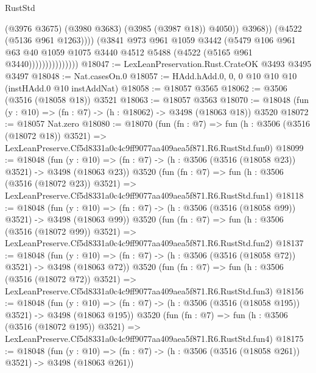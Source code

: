 \begin{lexlean}{RustStd}
\begin{coremodule}
                                      (@3976 @3675)
                                      (@3980 @3683)
                                      (@3985 (@3987 @18))
                                      @4050))
                                  @3968))
                              (@4522 (@5136 @961 @1263))))
                          (@3841
                            @973
                            @961
                            @1059
                            @3442
                            (@5479
                              @106
                              @961
                              @63
                              @40
                              @1059
                              @1075
                              @3440
                              @4512
                              @5488
                              (@4522 (@5165 @961 @3440)))))))))))))))
@18047 := LexLeanPreservation.Rust.CrateOK @3493 @3495 @3497
@18048 := Nat.casesOn.{0}
@18057 := HAdd.hAdd.{0, 0, 0} @10 @10 @10 (instHAdd.{0} @10 instAddNat)
@18058 := @18057 @3565
@18062 := @3506 (@3516 (@18058 @18)) @3521
@18063 := @18057 @3563
@18070 := @18048 (fun (y : @10) => (fn : @7) -> (h : @18062) -> @3498 (@18063 @18)) @3520
@18072 := @18057 Nat.zero
@18080 := @18070
    (fun (fn : @7) =>
    fun (h : @3506 (@3516 (@18072 @18)) @3521) =>
    LexLeanPreserve.Cf5d8331a0c4c9ff9077aa409aea5f871.R6.RustStd.fun0)
@18099 := @18048
    (fun (y : @10) => (fn : @7) -> (h : @3506 (@3516 (@18058 @23)) @3521) -> @3498 (@18063 @23))
    @3520
    (fun (fn : @7) =>
    fun (h : @3506 (@3516 (@18072 @23)) @3521) =>
    LexLeanPreserve.Cf5d8331a0c4c9ff9077aa409aea5f871.R6.RustStd.fun1)
@18118 := @18048
    (fun (y : @10) => (fn : @7) -> (h : @3506 (@3516 (@18058 @99)) @3521) -> @3498 (@18063 @99))
    @3520
    (fun (fn : @7) =>
    fun (h : @3506 (@3516 (@18072 @99)) @3521) =>
    LexLeanPreserve.Cf5d8331a0c4c9ff9077aa409aea5f871.R6.RustStd.fun2)
@18137 := @18048
    (fun (y : @10) => (fn : @7) -> (h : @3506 (@3516 (@18058 @72)) @3521) -> @3498 (@18063 @72))
    @3520
    (fun (fn : @7) =>
    fun (h : @3506 (@3516 (@18072 @72)) @3521) =>
    LexLeanPreserve.Cf5d8331a0c4c9ff9077aa409aea5f871.R6.RustStd.fun3)
@18156 := @18048
    (fun (y : @10) => (fn : @7) -> (h : @3506 (@3516 (@18058 @195)) @3521) -> @3498 (@18063 @195))
    @3520
    (fun (fn : @7) =>
    fun (h : @3506 (@3516 (@18072 @195)) @3521) =>
    LexLeanPreserve.Cf5d8331a0c4c9ff9077aa409aea5f871.R6.RustStd.fun4)
@18175 := @18048
    (fun (y : @10) => (fn : @7) -> (h : @3506 (@3516 (@18058 @261)) @3521) -> @3498 (@18063 @261))

\end{coremodule}
\end{lexlean}
